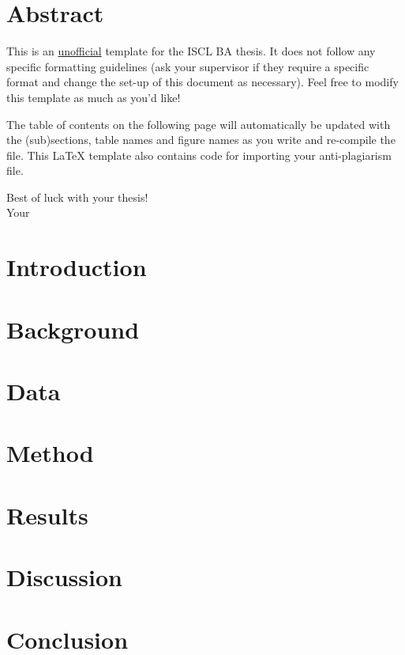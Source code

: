 \documentclass[a4paper]{article}
\begin{document}
% 

\newpage
\section*{Abstract}
This is an \underline{unofficial} template for the ISCL BA thesis. 
It does not follow any specific formatting guidelines (ask your supervisor if they require a specific format and change the set-up of this document as necessary).
Feel free to modify this template as much as you'd like!

The table of contents on the following page will automatically be updated with the (sub)sections, table names and figure names as you write and re-compile the file.
This \LaTeX{} template also contains code for importing your anti-plagiarism file.

Best of luck with your thesis!\\
Your \citeauthor{fachschaft}

\newpage
\tableofcontents
\listoftables
\listoffigures
\newpage


\section{Introduction}
\blindtext{}

\section{Background}
\blindtext{}

\section{Data}
\blindtext{}

\section{Method}
\blindtext{}

\blindtext{}

\section{Results}
\blindtext{}

\section{Discussion}
\blindtext{}

\section{Conclusion}
\blindtext{}



\end{document}
